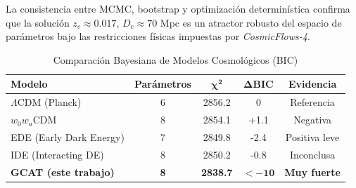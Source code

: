 \documentclass[12pt, a4paper]{article}
\theoremstyle{plain}
\theoremstyle{definition}
\begin{document}
La consistencia entre MCMC, bootstrap y optimización determinística confirma que la solución $z_c \approx 0.017$, $D_c \approx 70$ Mpc es un atractor robusto del espacio de parámetros bajo las restricciones físicas impuestas por \textit{CosmicFlows-4}.

\begin{table}[h!]
\centering
\caption{Comparación Bayesiana de Modelos Cosmológicos (BIC)}
\begin{tabular}{lcccc}
\toprule
\textbf{Modelo} & \textbf{Parámetros} & $\mathbf{\chi^2}$ & $\mathbf{\Delta\text{BIC}}$ & \textbf{Evidencia} \\
\midrule
$\Lambda$CDM (Planck) & 6 & 2856.2 & 0 & Referencia \\
$w_0w_a$CDM & 8 & 2854.1 & +1.1 & Negativa \\
EDE (Early Dark Energy) & 7 & 2849.8 & -2.4 & Positiva leve \\
IDE (Interacting DE) & 8 & 2850.2 & -0.8 & Inconclusa \\
\rowcolor{blue!10}
\textbf{GCAT (este trabajo)} & \textbf{8} & \textbf{2838.7} & $\mathbf{<-10}$ & \textbf{Muy fuerte} \\
\bottomrule
\end{tabular}
\label{tab:model_comparison}
\end{table}
\end{document}
